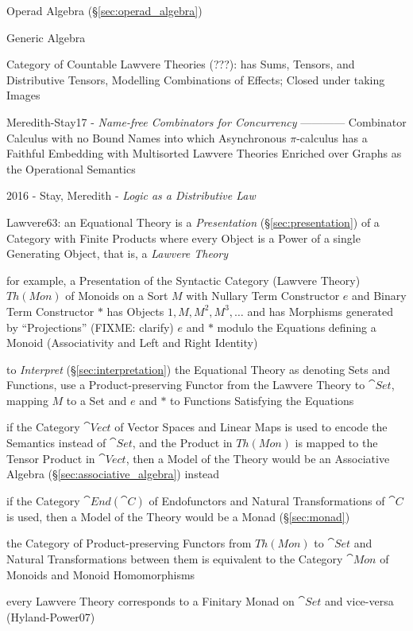 Operad Algebra (\S\ref{sec:operad_algebra})

Generic Algebra

Category of Countable Lawvere Theories (???): has Sums, Tensors, and
Distributive Tensors, Modelling Combinations of Effects; Closed under
taking Images \cite{hyland-power06}

Meredith-Stay17 - \emph{Name-free Combinators for Concurrency} ------------
Combinator Calculus with no Bound Names into which Asynchronous
$\pi$-calculus has a Faithful Embedding with Multisorted Lawvere
Theories Enriched over Graphs as the Operational Semantics

\asterism

2016 - Stay, Meredith - \emph{Logic as a Distributive Law}

Lawvere63: an Equational Theory is a \emph{Presentation}
(\S\ref{sec:presentation}) of a Category with Finite Products
where every Object is a Power of a single Generating Object, that is, a
\emph{Lawvere Theory}

for example, a Presentation of the Syntactic Category (Lawvere Theory) $Th(Mon)$
of Monoids on a Sort $M$ with Nullary Term Constructor $e$ and Binary Term
Constructor $*$ has Objects $1, M, M^2, M^3, \ldots$ and has Morphisms generated
by ``Projections'' (FIXME: clarify) $e$ and $*$ modulo the Equations defining a
Monoid (Associativity and Left and Right Identity)

to \emph{Interpret} (\S\ref{sec:interpretation}) the Equational Theory as
denoting Sets and Functions, use a Product-preserving Functor from the Lawvere
Theory to $\cat{Set}$, mapping $M$ to a Set and $e$ and $*$ to Functions
Satisfying the Equations

if the Category $\cat{Vect}$ of Vector Spaces and Linear Maps is used to encode
the Semantics instead of $\cat{Set}$, and the Product in $Th(Mon)$ is mapped to
the Tensor Product in $\cat{Vect}$, then a Model of the Theory would be an
Associative Algebra (\S\ref{sec:associative_algebra}) instead

if the Category $\cat{End}(\cat{C})$ of Endofunctors and Natural Transformations
of $\cat{C}$ is used, then a Model of the Theory would be a Monad
(\S\ref{sec:monad})

the Category of Product-preserving Functors from $Th(Mon)$ to $\cat{Set}$ and
Natural Transformations between them is equivalent to the Category $\cat{Mon}$
of Monoids and Monoid Homomorphisms

every Lawvere Theory corresponds to a Finitary Monad on $\cat{Set}$ and
vice-versa (Hyland-Power07)

